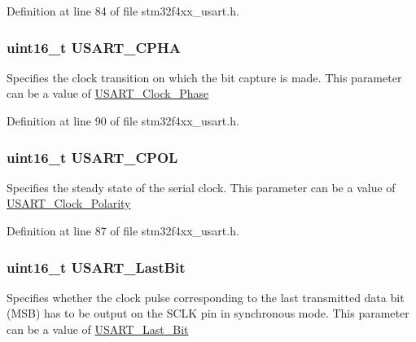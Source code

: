 Definition at line 84 of file stm32f4xx\-\_\-usart.\-h.

\hypertarget{struct_u_s_a_r_t___clock_init_type_def_ae8d00e2e6f99439097a1b56cd33dd9f4}{
\subsubsection[{U\-S\-A\-R\-T\-\_\-\-C\-P\-H\-A}]{\setlength{\rightskip}{0pt plus 5cm}uint16\-\_\-t U\-S\-A\-R\-T\-\_\-\-C\-P\-H\-A}}\label{struct_u_s_a_r_t___clock_init_type_def_ae8d00e2e6f99439097a1b56cd33dd9f4}
Specifies the clock transition on which the bit capture is made. This parameter can be a value of \hyperlink{group___u_s_a_r_t___clock___phase}{U\-S\-A\-R\-T\-\_\-\-Clock\-\_\-\-Phase} 

Definition at line 90 of file stm32f4xx\-\_\-usart.\-h.

\hypertarget{struct_u_s_a_r_t___clock_init_type_def_ab6507c7489a2e05e4ef1ade9fbf057d5}{
\subsubsection[{U\-S\-A\-R\-T\-\_\-\-C\-P\-O\-L}]{\setlength{\rightskip}{0pt plus 5cm}uint16\-\_\-t U\-S\-A\-R\-T\-\_\-\-C\-P\-O\-L}}\label{struct_u_s_a_r_t___clock_init_type_def_ab6507c7489a2e05e4ef1ade9fbf057d5}
Specifies the steady state of the serial clock. This parameter can be a value of \hyperlink{group___u_s_a_r_t___clock___polarity}{U\-S\-A\-R\-T\-\_\-\-Clock\-\_\-\-Polarity} 

Definition at line 87 of file stm32f4xx\-\_\-usart.\-h.

\hypertarget{struct_u_s_a_r_t___clock_init_type_def_a998735e29b6f77d3e993d8d34c74cbca}{
\subsubsection[{U\-S\-A\-R\-T\-\_\-\-Last\-Bit}]{\setlength{\rightskip}{0pt plus 5cm}uint16\-\_\-t U\-S\-A\-R\-T\-\_\-\-Last\-Bit}}\label{struct_u_s_a_r_t___clock_init_type_def_a998735e29b6f77d3e993d8d34c74cbca}
Specifies whether the clock pulse corresponding to the last transmitted data bit (M\-S\-B) has to be output on the S\-C\-L\-K pin in synchronous mode. This parameter can be a value of \hyperlink{group___u_s_a_r_t___last___bit}{U\-S\-A\-R\-T\-\_\-\-Last\-\_\-\-Bit} 

